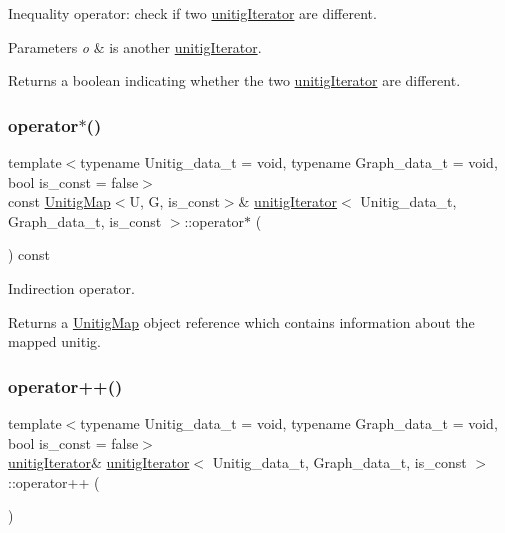 Inequality operator\+: check if two \hyperlink{classunitigIterator}{unitig\+Iterator} are different. 


\begin{DoxyParams}{Parameters}
{\em o} & is another \hyperlink{classunitigIterator}{unitig\+Iterator}. \\
\hline
\end{DoxyParams}
\begin{DoxyReturn}{Returns}
a boolean indicating whether the two \hyperlink{classunitigIterator}{unitig\+Iterator} are different. 
\end{DoxyReturn}
\mbox{\label{classunitigIterator_a6af9150a527c60d1bf81ed4352875372}} 
\subsubsection{\texorpdfstring{operator$\ast$()}{operator*()}}
{\footnotesize\ttfamily template$<$typename Unitig\+\_\+data\+\_\+t  = void, typename Graph\+\_\+data\+\_\+t  = void, bool is\+\_\+const = false$>$ \\
const \hyperlink{classUnitigMap}{Unitig\+Map}$<$U, G, is\+\_\+const$>$\& \hyperlink{classunitigIterator}{unitig\+Iterator}$<$ Unitig\+\_\+data\+\_\+t, Graph\+\_\+data\+\_\+t, is\+\_\+const $>$\+::operator$\ast$ (\begin{DoxyParamCaption}{ }\end{DoxyParamCaption}) const}



Indirection operator. 

\begin{DoxyReturn}{Returns}
a \hyperlink{classUnitigMap}{Unitig\+Map} object reference which contains information about the mapped unitig. 
\end{DoxyReturn}
\mbox{\label{classunitigIterator_a9ef74119d337be7ba4b32a8d61318605}} 
\subsubsection{\texorpdfstring{operator++()}{operator++()}\hspace{0.1cm}{\footnotesize\ttfamily [1/2]}}
{\footnotesize\ttfamily template$<$typename Unitig\+\_\+data\+\_\+t  = void, typename Graph\+\_\+data\+\_\+t  = void, bool is\+\_\+const = false$>$ \\
\hyperlink{classunitigIterator}{unitig\+Iterator}\& \hyperlink{classunitigIterator}{unitig\+Iterator}$<$ Unitig\+\_\+data\+\_\+t, Graph\+\_\+data\+\_\+t, is\+\_\+const $>$\+::operator++ (\begin{DoxyParamCaption}{ }\end{DoxyParamCaption})}



